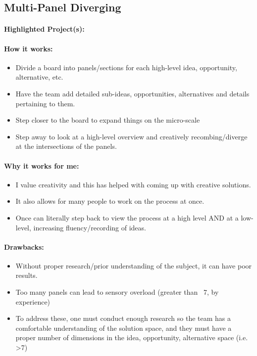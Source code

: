 \documentclass[a4paper,12pt]{article}
\begin{document}
\subsection{Multi-Panel Diverging}
\paragraph{Highlighted Project(s): }
\paragraph{How it works: }
\begin{itemize}
	\item Divide a board into panels/sections for each high-level {idea, opportunity, alternative, etc.}
	\item Have the team add detailed sub-{ideas, opportunities, alternatives} and details pertaining to them.
	\item Step closer to the board to expand things on the micro-scale
	\item Step away to look at a high-level overview and creatively recombing/diverge at the intersections of the panels.
\end{itemize}

\paragraph{Why it works for me: }
\begin{itemize}
\item I value creativity and this has helped with coming up with creative solutions.
\item It also allows for many people to work on the process at once. 
\item Once can literally step back to view the process at a high level AND at a low-level, increasing fluency/recording of ideas.
\end{itemize}

\paragraph{Drawbacks: }
\begin{itemize}
	\item Without proper research/prior understanding of the subject, it can have poor results.
	\item Too many panels can lead to sensory overload (greater than ~7, by experience)
	\item To address these, one must conduct enough research so the team has a comfortable understanding of the solution space, and they must have a proper number of dimensions in the {idea, opportunity, alternative} space (i.e. >7)
\end{itemize}
\end{document}
